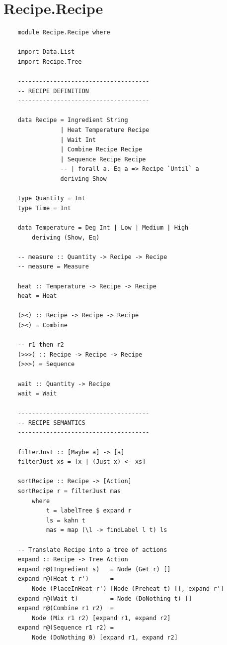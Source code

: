 \documentclass[11pt]{article}
\begin{document}
    \newpage

    \appendix

    \section{Recipe.Recipe}

    \begin{tt}
    \small
    \begin{lstlisting}
    module Recipe.Recipe where
    
    import Data.List
    import Recipe.Tree
    
    -------------------------------------
    -- RECIPE DEFINITION
    -------------------------------------
    
    data Recipe = Ingredient String
                | Heat Temperature Recipe
                | Wait Int
                | Combine Recipe Recipe
                | Sequence Recipe Recipe
                -- | forall a. Eq a => Recipe `Until` a
                deriving Show
    
    type Quantity = Int
    type Time = Int
    
    data Temperature = Deg Int | Low | Medium | High
        deriving (Show, Eq)
    
    -- measure :: Quantity -> Recipe -> Recipe
    -- measure = Measure
    
    heat :: Temperature -> Recipe -> Recipe
    heat = Heat
    
    (><) :: Recipe -> Recipe -> Recipe
    (><) = Combine
    
    -- r1 then r2
    (>>>) :: Recipe -> Recipe -> Recipe
    (>>>) = Sequence
    
    wait :: Quantity -> Recipe
    wait = Wait
    
    -------------------------------------
    -- RECIPE SEMANTICS
    -------------------------------------
    
    filterJust :: [Maybe a] -> [a]
    filterJust xs = [x | (Just x) <- xs]
    
    sortRecipe :: Recipe -> [Action]
    sortRecipe r = filterJust mas
        where
            t = labelTree $ expand r
            ls = kahn t
            mas = map (\l -> findLabel l t) ls
    
    -- Translate Recipe into a tree of actions
    expand :: Recipe -> Tree Action
    expand r@(Ingredient s)   = Node (Get r) []
    expand r@(Heat t r')      =
        Node (PlaceInHeat r') [Node (Preheat t) [], expand r']
    expand r@(Wait t)         = Node (DoNothing t) []
    expand r@(Combine r1 r2)  =
        Node (Mix r1 r2) [expand r1, expand r2]
    expand r@(Sequence r1 r2) =
        Node (DoNothing 0) [expand r1, expand r2]
    

\end{lstlisting}
\end{tt}
\end{document}
